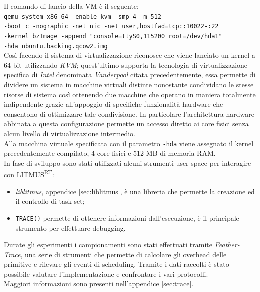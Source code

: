 \noindent Il comando di lancio della VM è il seguente:\\

\noindent \texttt{qemu-system-x86\_64 -enable-kvm -smp 4 -m 512 \\
-boot c -nographic -net nic -net user,hostfwd=tcp::10022-:22 \\
-kernel bzImage -append "console=ttyS0,115200 root=/dev/hda1" \\ 
-hda ubuntu.backing.qcow2.img}\\

\noindent Così facendo il sistema di virtualizzazione riconosce che viene lanciato un kernel a 64 bit utilizzando \textit{KVM}; quest'ultimo supporta la tecnologia di virtualizzazione specifica di \textit{Intel} denominata \textit{Vanderpool} citata precedentemente, essa permette di dividere un sistema in macchine virtuali distinte nonostante condividano le stesse risorse di sistema così ottenendo due macchine che operano in maniera totalmente indipendente grazie all'appoggio di specifiche funzionalità hardware che consentono di ottimizzare tale condivisione. In particolare l'architettura hardware abbinata a questa configurazione permette un accesso diretto ai core fisici senza alcun livello di virtualizzazione intermedio.\\
\noindent Alla macchina virtuale specificata con il parametro \texttt{-hda} viene assegnato il kernel precedentemente compilato, 4 core fisici e 512 MB di memoria RAM.\\

\noindent In fase di sviluppo sono stati utilizzati alcuni strumenti user-space per interagire con LITMUS\textsuperscript{RT}:\\

\begin{itemize}
  \item \textit{liblitmus}, appendice \ref{sec:liblitmus}, è una libreria che permette la creazione ed il controllo di task set;
  \item \texttt{TRACE()} permette di ottenere informazioni dall'esecuzione, è il principale strumento per effettuare debugging.\\
\end{itemize}

\noindent Durate gli esperimenti i campionamenti sono stati effettuati tramite \textit{Feather-Trace}, una serie di strumenti che permette di calcolare gli overhead delle primitive e rilevare gli eventi di scheduling. Tramite i dati raccolti è stato possibile valutare l'implementazione e confrontare i vari protocolli.\\
Maggiori informazioni sono presenti nell'appendice \ref{sec:trace}.\\

